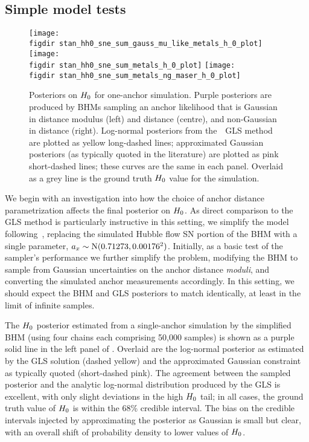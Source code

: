 \documentclass[a4paper,fleqn,usenatbib]{mnras}
\newcommand{\riess}{\citetalias{Riess_etal:2016}}
\begin{document}
{%

\subsection{Simple model tests}
\label{section:simple_sim}

\begin{figure*}
\texttt{[image: \\figdir stan\_hh0\_sne\_sum\_gauss\_mu\_like\_metals\_h\_0\_plot]}
\texttt{[image: \\figdir stan\_hh0\_sne\_sum\_metals\_h\_0\_plot]}
\texttt{[image: \\figdir stan\_hh0\_sne\_sum\_metals\_ng\_maser\_h\_0\_plot]}
\caption{Posteriors on $H_0$ for one-anchor simulation. Purple posteriors are produced by BHMs sampling an anchor likelihood that is Gaussian in distance modulus (left) and distance (centre), and non-Gaussian in distance (right). Log-normal posteriors from the~\protect\riess\ GLS method are plotted as yellow long-dashed lines; approximated Gaussian posteriors (as typically quoted in the literature) are plotted as pink short-dashed lines; these curves are the same in each panel. Overlaid as a grey line is the ground truth $H_0$ value for the simulation.}
\label{figure:simple_sim_h_0_comp}
\end{figure*}

We begin with an investigation into how the choice of anchor distance parametrization affects the final posterior on $H_0$. As direct comparison to the GLS method is particularly instructive in this setting, we simplify the model following~\riess, replacing the simulated Hubble flow SN portion of the BHM with a single parameter, $a_x \sim {\rm N}(0.71273, 0.00176^2)$. Initially, as a basic test of the sampler's performance we further simplify the problem, modifying the BHM to sample from Gaussian uncertainties on the anchor distance {\em moduli}, and converting the simulated anchor measurements accordingly. In this setting, we should expect the BHM and GLS posteriors to match identically, at least in the limit of infinite samples.

The $H_0$ posterior estimated from a single-anchor simulation by the simplified BHM (using four chains each comprising 50,000 samples) is shown as a purple solid line in the left panel of . Overlaid are the log-normal posterior as estimated by the GLS solution (dashed yellow) and the approximated Gaussian constraint as typically quoted (short-dashed pink). The agreement between the sampled posterior and the analytic log-normal distribution produced by the GLS is excellent, with only slight deviations in the high $H_0$ tail; in all cases, the ground truth value of $H_0$ is within the 68\% credible interval. The bias on the credible intervals injected by approximating the posterior as Gaussian is small but clear, with an overall shift of probability density to lower values of $H_0$.

}
\end{document}
